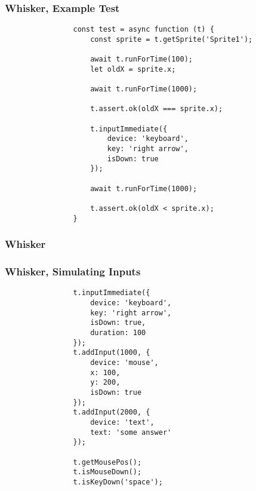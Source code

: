 \begin{frame}[fragile]\frametitle{Whisker, Example Test}
    \begin{center}
        \begin{minipage}{.95\textwidth}
            \begin{verbatim}
                const test = async function (t) {
                    const sprite = t.getSprite('Sprite1');

                    await t.runForTime(100);
                    let oldX = sprite.x;

                    await t.runForTime(1000);

                    t.assert.ok(oldX === sprite.x);

                    t.inputImmediate({
                        device: 'keyboard',
                        key: 'right arrow',
                        isDown: true
                    });

                    await t.runForTime(1000);

                    t.assert.ok(oldX < sprite.x);
                }
            \end{verbatim}
        \end{minipage}
    \end{center}
\end{frame}

\begin{frame}\frametitle{Whisker}
\end{frame}

\begin{frame}[fragile]\frametitle{Whisker, Simulating Inputs}
    \begin{center}
        \begin{minipage}{.95\textwidth}
            \begin{verbatim}
                t.inputImmediate({
                    device: 'keyboard',
                    key: 'right arrow',
                    isDown: true,
                    duration: 100
                });
                t.addInput(1000, {
                    device: 'mouse',
                    x: 100,
                    y: 200,
                    isDown: true
                });
                t.addInput(2000, {
                    device: 'text',
                    text: 'some answer'
                });

                t.getMousePos();
                t.isMouseDown();
                t.isKeyDown('space');
            \end{verbatim}
        \end{minipage}
    \end{center}
\end{frame}

